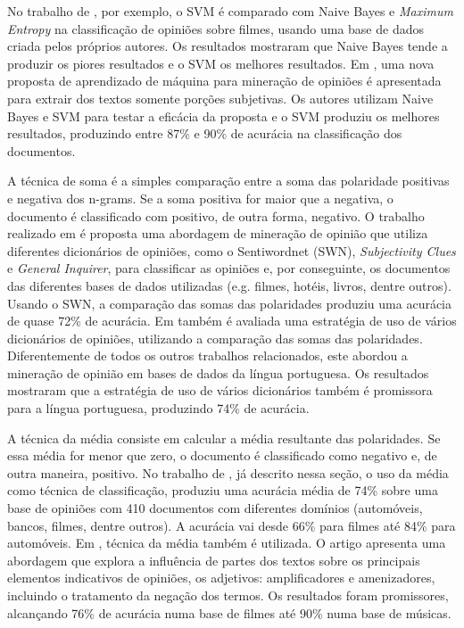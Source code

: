 \documentclass[template.tex]{subfiles}
\begin{document}
No trabalho de , por exemplo, o SVM é comparado com Naive Bayes e \textit{Maximum Entropy} na classificação de opiniões sobre filmes, usando uma base de dados criada pelos próprios autores. Os resultados mostraram que Naive Bayes tende a produzir os piores resultados e o SVM os melhores resultados. Em , uma nova proposta de aprendizado de máquina para mineração de opiniões é apresentada para extrair dos textos somente porções subjetivas. Os autores utilizam Naive Bayes e SVM para testar a eficácia da proposta e o SVM produziu os melhores resultados, produzindo entre 87\% e 90\% de acurácia na classificação dos documentos.

A técnica de soma é a simples comparação entre a soma das polaridade positivas e negativa dos n-grams. Se a soma positiva for maior que a negativa, o documento é classificado com positivo, de outra forma, negativo. O trabalho realizado em  é proposta uma abordagem de mineração de opinião que utiliza diferentes dicionários de opiniões, como o Sentiwordnet (SWN), \textit{Subjectivity Clues} e \textit{General Inquirer}, para classificar as opiniões e, por conseguinte, os documentos das diferentes bases de dados utilizadas (e.g. filmes, hotéis, livros, dentre outros). Usando o SWN, a comparação das somas das polaridades produziu uma acurácia de quase 72\% de acurácia. Em  também é avaliada uma estratégia de uso de vários dicionários de opiniões, utilizando a comparação das somas das polaridades. Diferentemente de todos os outros trabalhos relacionados, este abordou a mineração de opinião em bases de dados da língua portuguesa. 
Os resultados mostraram que a estratégia de uso de vários dicionários também é promissora para a língua portuguesa, produzindo 74\% de acurácia.

A técnica da média consiste em calcular a média resultante das polaridades. Se essa média for menor que zero, o documento é classificado como negativo e, de outra maneira, positivo. No trabalho de , já descrito nessa seção, o uso da média como técnica de classificação, produziu uma acurácia média de 74\% sobre uma base de opiniões com 410 documentos com diferentes domínios (automóveis, bancos, filmes, dentre outros). A acurácia vai desde 66\% para filmes até 84\% para automóveis. 
Em , técnica da média também é utilizada. O artigo apresenta uma abordagem que explora a influência de partes dos textos sobre os principais elementos indicativos de opiniões, os adjetivos: amplificadores e amenizadores, incluindo o tratamento da negação dos termos. Os resultados foram promissores, alcançando 76\% de acurácia numa base de filmes \cite{pang2004sentimental} até 90\% numa base de músicas.
\end{document}
